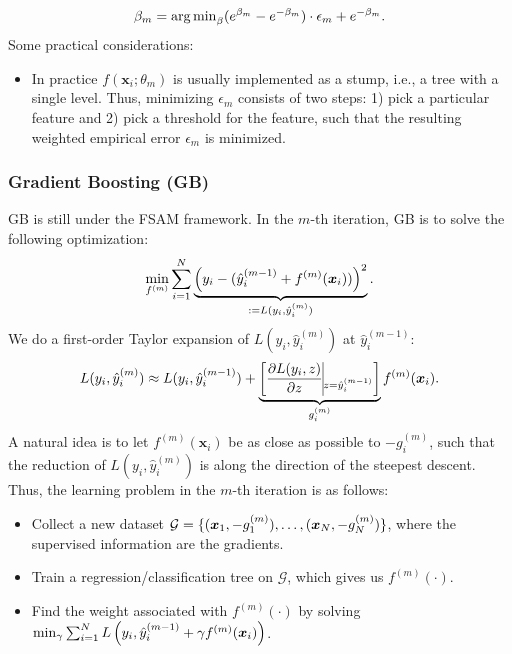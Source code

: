         \begin{equation}
            \beta_m = \operatorname{arg\,min}_{\beta} (e^{\beta_m} - e^{-\beta_m}) \cdot \epsilon_m + e^{-\beta_m}.
        \end{equation}
         Some practical considerations:
        \begin{itemize}
            \item In practice $f(\bm{x}_i; \theta_m)$ is usually implemented as a stump, i.e., a tree with a single level.
            Thus, minimizing $\epsilon_m$ consists of two steps: 1) pick a particular feature and 2) pick a threshold for the feature, such that the resulting weighted empirical error $\epsilon_m$ is minimized.
        \end{itemize}
        
        
        
        
\subsubsection{Gradient Boosting (GB)}
        GB is still under the FSAM framework.
        In the $m$-th iteration, GB is to solve the following optimization:
            \begin{equation}\label{XGBoost-model}
                \min_{f^{(m)}} \sum_{i=1}^{N}{
                    \underbrace{\left( y_i - (\hat{y}^{(m-1)}_i + f^{(m)}(\bm{x}_i)) \right)^2}_{:=L(y_i, \hat{y}_i^{(m)}) }.
                }
            \end{equation}
        We do a first-order Taylor expansion of $L(y_i, \hat{y}_i^{(m)})$ at $\hat{y}_i^{(m-1)}$:
            \begin{equation}
                L(y_i, \hat{y}_i^{(m)}) \approx L(y_i, \hat{y}_i^{(m-1)}) + \underbrace{\left[ \frac{\partial L(y_i, z)}{\partial z}\vline_{z = \hat{y}_i^{(m-1)}} \right]}_{g_{i}^{(m)}}  f^{(m)}(\bm{x}_i).
            \end{equation}
        A natural idea is to let $f^{(m)}(\bm{x}_i)$ be as close as possible to $-g^{(m)}_i$, such that the reduction of $L(y_i, \hat{y}_i^{(m)})$ is along the direction of the steepest descent.
        Thus, the learning problem  in the $m$-th iteration is as follows:
            \begin{itemize}
                \item  Collect a new dataset $\mathcal{G}=\{ (\bm{x}_1, -g^{(m)}_1), \ldots, (\bm{x}_N, -g^{(m)}_N) \}$, where the supervised information are the gradients.
                \item  Train a regression/classification tree on $\mathcal{G}$, which gives us $f^{(m)}(\cdot)$. 
                \item  Find the weight associated with $f^{(m)}(\cdot)$ by solving $\min_{\gamma} \sum_{i=1}^{N}{L\left(y_i, \hat{y}_i^{(m-1)} + \gamma f^{(m)}(\bm{x}_i)\right)}$.
            \end{itemize}


